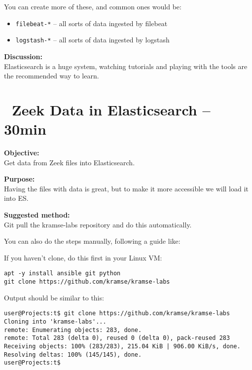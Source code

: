 \documentclass[a4paper,11pt,notitlepage]{report}
\begin{document}
You can create more of these, and common ones would be:
\begin{itemize}
\item \verb+filebeat-*+ -- all sorts of data ingested by filebeat
\item \verb+logstash-*+ -- all sorts of data ingested by logstash

\end{itemize}

{\bf Discussion:}\\
Elasticsearch is a huge system, watching tutorials and playing with the tools are the recommended way to learn.



\chapter{\faExclamationTriangle\ Zeek Data in Elasticsearch -- 30min}
\label{ex:zeek-json-es}

{\bf Objective:}\\
Get data from Zeek files into Elasticsearch.


{\bf Purpose:}\\
Having the files with data is great, but to make it more accessible we will load it into ES.


{\bf Suggested method:}\\
Git pull the kramse-labs repository and do this automatically.

You can also do the steps manually, following a guide like:\\


If you haven't clone, do this first in your Linux VM:
\begin{verbatim}
apt -y install ansible git python
git clone https://github.com/kramse/kramse-labs
\end{verbatim}

Output should be similar to this:
\begin{verbatim}
user@Projects:t$ git clone https://github.com/kramse/kramse-labs
Cloning into 'kramse-labs'...
remote: Enumerating objects: 283, done.
remote: Total 283 (delta 0), reused 0 (delta 0), pack-reused 283
Receiving objects: 100% (283/283), 215.04 KiB | 906.00 KiB/s, done.
Resolving deltas: 100% (145/145), done.
user@Projects:t$
\end{verbatim}
\end{document}
